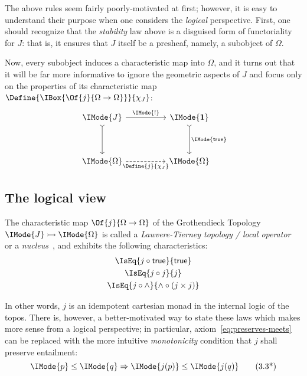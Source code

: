 \documentclass{article}
\newcommand\One{\mathbf{1}}
\begin{document}
The above rules seem fairly poorly-motivated at first; however, it is
easy to understand their purpose when one considers the \emph{logical}
perspective. First, one should recognize that the \emph{stability} law
above is a disguised form of functoriality for $J$: that is, it
ensures that $J$ itself be a presheaf, namely, a subobject of
$\Omega$.

Now, every subobject induces a characteristic map into $\Omega$, and
it turns out that it will be far more informative to ignore the
geometric aspects of $J$ and focus only on the properties of its
characteristic map $\Define{\IBox{\Of{j}{\Omega\to\Omega}}}{\chi_J}$:
\[
  \begin{tikzcd}[sep=huge]
    \IMode{J}
    \arrow[r,"\IMode{!}"]
    \arrow[d,rightarrowtail]
    &
    \IMode{\One}
    \arrow[d,rightarrowtail, "\IMode{\True}"]
    \\
    \IMode{\Omega}
    \arrow[r,swap,dashed,"\Define{j}{\chi_J}"]
    &
    \IMode{\Omega}
  \end{tikzcd}
\]

\subsection{The logical view}
\newcommand\Entails[2]{\IMode{#1}\leq\IMode{#2}}

\begin{definition}\label{def:lawvere-tierney}
The characteristic map $\Of{j}{\Omega\to\Omega}$ of the Grothendieck
Topology $\Mono{\IMode{J}}{\IMode{\Omega}}$ is called a
\emph{Lawvere-Tierney topology / local
  operator}~\cite{maclane-moerdijk:1992} or a
\emph{nucleus}~\cite{jacobs:1999}, and exhibits the following
characteristics:
\begin{gather}
  \IsEq{j\circ\True}{\True}
  \label{eq:preserves-true}
  \\
  \IsEq{j\circ j}{j}
  \label{eq:idempotency}
  \\
  \IsEq{j\circ\land}{\land\circ(j\times j)}
  \label{eq:preserves-meets}
\end{gather}
\end{definition}

In other words, $j$ is an idempotent cartesian monad in the internal
logic of the topos. There is, however, a better-motivated way to state
these laws which makes more sense from a logical perspective; in
particular, axiom~\ref{eq:preserves-meets} can be replaced with the
more intuitive \emph{monotonicity} condition that $j$ shall preserve
entailment:
\begin{equation}
  \Entails{p}{q}\Rightarrow\Entails{j(p)}{j(q)}
  \tag{3.3*}
  \label{eq:monotonicity}
\end{equation}
\end{document}

